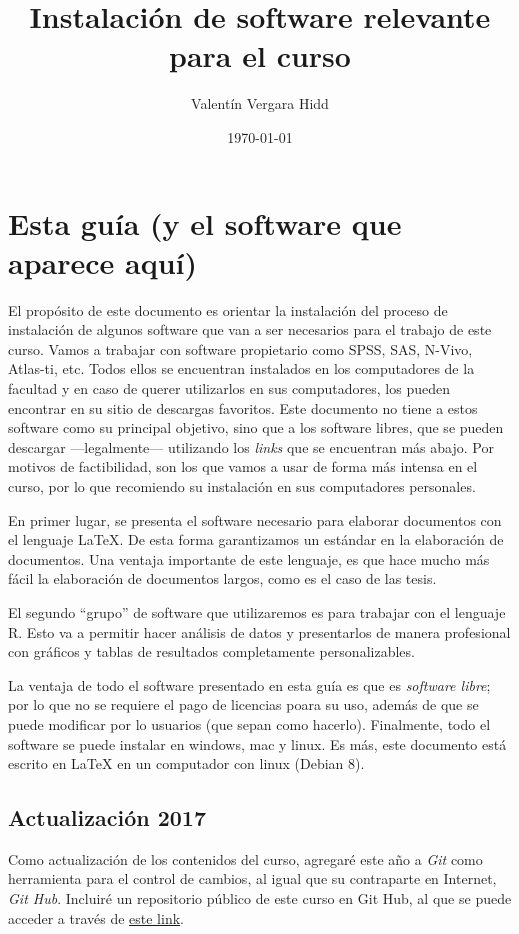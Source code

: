 \documentclass[letterpaper,12pt]{article}
\author{Valentín Vergara Hidd}
\title{Instalación de software relevante para el curso}
\date{\today}
\begin{document}
\maketitle

\section*{Esta guía (y el software que aparece aquí)}
El propósito de este documento es orientar la instalación del proceso de instalación de algunos software que van a ser necesarios para el trabajo de este curso. Vamos a trabajar con software propietario como SPSS, SAS, N-Vivo, Atlas-ti, etc. Todos ellos se encuentran instalados en los computadores de la facultad y en caso de querer utilizarlos en sus computadores, los pueden encontrar en su sitio de descargas favoritos. Este documento no tiene a estos software como su principal objetivo, sino que a los software libres, que se pueden descargar ---legalmente--- utilizando los \emph{links} que se encuentran más abajo. Por motivos de factibilidad, son los que vamos a usar de forma más intensa en el curso, por lo que recomiendo su instalación en sus computadores personales. 

En primer lugar, se presenta el software necesario para elaborar documentos con el lenguaje \LaTeX{}. De esta forma garantizamos un estándar en la elaboración de documentos. Una ventaja importante de este lenguaje, es que hace mucho más fácil la elaboración de documentos largos, como es el caso de las tesis.

El segundo ``grupo'' de software que utilizaremos es para trabajar con el lenguaje R. Esto va a permitir hacer análisis de datos y presentarlos de manera profesional con gráficos y tablas de resultados completamente personalizables.

La ventaja de todo el software presentado en esta guía es que es {\em software libre}; por lo que no se requiere el pago de licencias poara su uso, además de que se puede modificar por lo usuarios (que sepan como hacerlo). Finalmente, todo el software se puede instalar en windows, mac y linux. Es más, este documento está escrito en \LaTeX{} en un computador con linux (Debian 8).

\subsection*{Actualización 2017}
Como actualización de los contenidos del curso, agregaré este año a \emph{Git} como herramienta para el control de cambios, al igual que su contraparte en Internet, \emph{Git Hub}. Incluiré un repositorio público de este curso en Git Hub, al que se puede acceder a través de \href{http://miktex.org/}{este link}.
\end{document}
